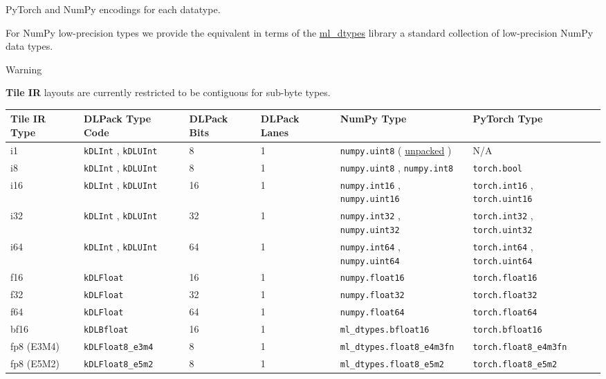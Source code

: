 \documentclass{article}
\begin{document}
PyTorch and NumPy encodings for each datatype.


For NumPy low-precision types we provide the equivalent in terms of the \href{https://github.com/jax-ml/ml_dtypes}{ml\_dtypes} library a standard collection of low-precision NumPy data types.


Warning


\textbf{Tile IR} layouts are currently restricted to be contiguous for sub-byte types.


\begin{longtable}{l|l|l|l|l|l}
\hline
\textbf{Tile IR} Type & DLPack Type Code & DLPack Bits & DLPack Lanes & NumPy Type & PyTorch Type \\ \hline
i1 & \texttt{kDLInt} , \texttt{kDLUInt} & 8 & 1 & \texttt{numpy.uint8} ( \href{https://numpy.org/devdocs/reference/generated/numpy.packbits.html}{unpacked} ) & N/A \\ \hline
i8 & \texttt{kDLInt} , \texttt{kDLUInt} & 8 & 1 & \texttt{numpy.uint8} , \texttt{numpy.int8} & \texttt{torch.bool} \\ \hline
i16 & \texttt{kDLInt} , \texttt{kDLUInt} & 16 & 1 & \texttt{numpy.int16} , \texttt{numpy.uint16} & \texttt{torch.int16} , \texttt{torch.uint16} \\ \hline
i32 & \texttt{kDLInt} , \texttt{kDLUInt} & 32 & 1 & \texttt{numpy.int32} , \texttt{numpy.uint32} & \texttt{torch.int32} , \texttt{torch.uint32} \\ \hline
i64 & \texttt{kDLInt} , \texttt{kDLUInt} & 64 & 1 & \texttt{numpy.int64} , \texttt{numpy.uint64} & \texttt{torch.int64} , \texttt{torch.uint64} \\ \hline
f16 & \texttt{kDLFloat} & 16 & 1 & \texttt{numpy.float16} & \texttt{torch.float16} \\ \hline
f32 & \texttt{kDLFloat} & 32 & 1 & \texttt{numpy.float32} & \texttt{torch.float32} \\ \hline
f64 & \texttt{kDLFloat} & 64 & 1 & \texttt{numpy.float64} & \texttt{torch.float64} \\ \hline
bf16 & \texttt{kDLBfloat} & 16 & 1 & \texttt{ml\_dtypes.bfloat16} & \texttt{torch.bfloat16} \\ \hline
fp8 (E3M4) & \texttt{kDLFloat8\_e3m4} & 8 & 1 & \texttt{ml\_dtypes.float8\_e4m3fn} & \texttt{torch.float8\_e4m3fn} \\ \hline
fp8 (E5M2) & \texttt{kDLFloat8\_e5m2} & 8 & 1 & \texttt{ml\_dtypes.float8\_e5m2} & \texttt{torch.float8\_e5m2} \\ \hline
\end{longtable}
\end{document}

